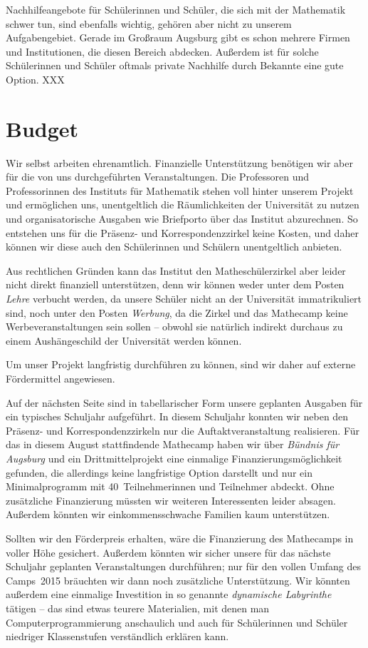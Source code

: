 \documentclass[12pt]{zettel}
\begin{document}
Nachhilfeangebote für Schülerinnen und Schüler, die sich mit der Mathematik
schwer tun, sind ebenfalls wichtig, gehören aber nicht zu unserem
Aufgabengebiet. Gerade im Großraum Augsburg gibt es schon mehrere Firmen und
Institutionen, die diesen Bereich abdecken. Außerdem ist für solche
Schülerinnen und Schüler oftmals private Nachhilfe durch Bekannte eine gute
Option. XXX


\section{Budget}

Wir selbst arbeiten ehrenamtlich. Finanzielle Unterstützung benötigen wir aber
für die von uns durchgeführten Veranstaltungen. Die Professoren und
Professorinnen des Instituts für Mathematik stehen voll hinter unserem Projekt
und ermöglichen uns, unentgeltlich die Räumlichkeiten der Universität zu nutzen
und organisatorische Ausgaben wie Briefporto über das Institut abzurechnen.
So entstehen uns für die Präsenz- und Korrespondenzzirkel keine Kosten, und
daher können wir diese auch den Schülerinnen und Schülern unentgeltlich
anbieten.

Aus rechtlichen Gründen kann das Institut den Matheschülerzirkel aber leider nicht
direkt finanziell unterstützen, denn wir können weder unter dem Posten
\emph{Lehre} verbucht werden, da unsere Schüler nicht an der Universität
immatrikuliert sind, noch unter den Posten \emph{Werbung}, da die Zirkel und
das Mathecamp keine Werbeveranstaltungen sein sollen -- obwohl sie natürlich indirekt
durchaus zu einem Aushängeschild der Universität werden können.

Um unser Projekt langfristig durchführen zu können, sind wir daher auf externe
Fördermittel angewiesen.

Auf der nächsten Seite sind in tabellarischer Form unsere geplanten Ausgaben für ein
typisches Schuljahr aufgeführt. In diesem Schuljahr konnten wir
neben den Präsenz- und Korrespondenzzirkeln nur die Auftaktveranstaltung
realisieren. Für das in diesem August
stattfindende Mathecamp haben wir über \emph{Bündnis für Augsburg} und ein
Drittmittelprojekt eine einmalige Finanzierungsmöglichkeit gefunden, die
allerdings keine langfristige Option darstellt und nur ein Minimalprogramm mit 40~Teilnehmerinnen und
Teilnehmer abdeckt. Ohne zusätzliche Finanzierung müssten wir weiteren
Interessenten leider absagen. Außerdem könnten wir einkommensschwache Familien
kaum unterstützen.

Sollten wir den Förderpreis erhalten, wäre die Finanzierung des Mathecamps in
voller Höhe gesichert. Außerdem könnten wir sicher unsere für das nächste Schuljahr
geplanten Veranstaltungen durchführen; nur für den vollen Umfang des
Camps~2015 bräuchten wir dann noch zusätzliche Unterstützung. Wir könnten außerdem
eine einmalige Investition in so genannte \emph{dynamische Labyrinthe} tätigen --
das sind etwas teurere Materialien, mit denen man
Computerprogrammierung anschaulich und auch für Schülerinnen und Schüler niedriger Klassenstufen
verständlich erklären kann.
\end{document}
